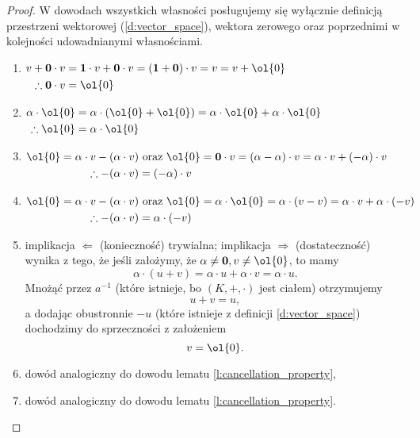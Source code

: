\begin{proof}
    W dowodach wszystkich własności posługujemy się wyłącznie definicją przestrzeni wektorowej (\ref{d:vector_space}), wektora zerowego oraz poprzednimi w kolejności udowadnianymi własnościami.
    \begin{enumerate}
        \item $\begin{aligned}[t]
            v + \mathbf{0} \cdot v &= \mathbf{1} \cdot v + \mathbf{0} \cdot v = (\mathbf{1} + \mathbf{0}) \cdot v = v = v + \ol{0} \\
            \therefore \mathbf{0} \cdot v &= \ol{0}
            \end{aligned}$
        \item $\begin{aligned}[t]
            \alpha \cdot \ol{0} &= \alpha \cdot (\ol{0} + \ol{0}) = \alpha \cdot \ol{0} + \alpha \cdot \ol{0} \\
            \therefore \ol{0} &= \alpha \cdot \ol{0}
            \end{aligned}$
        \item $\begin{aligned}[t]
            \ol{0} = \alpha \cdot v - (\alpha \cdot v) &\text{ oraz } \ol{0} = \mathbf{0} \cdot v = (\alpha - \alpha) \cdot v = \alpha \cdot v + (-\alpha) \cdot v \\
            \therefore -(\alpha \cdot v) &= (-\alpha) \cdot v
            \end{aligned}$
        \item $\begin{aligned}[t]
            \ol{0} = \alpha \cdot v - (\alpha \cdot v) &\text{ oraz } \ol{0} = \alpha \cdot \ol{0} = \alpha \cdot (v - v) = \alpha \cdot v + \alpha \cdot (-v) \\
            \therefore -(\alpha \cdot v) &= \alpha \cdot (-v)
            \end{aligned}$
        \item implikacja $\Leftarrow$ (konieczność) trywialna; implikacja $\Rightarrow$ (dostateczność) wynika z tego, że jeśli założymy, że $\alpha \neq \mathbf{0}, v \neq \ol{0}$, to mamy
            $$ \alpha \cdot (u + v) = \alpha \cdot u + \alpha \cdot v = \alpha \cdot u. $$
            Mnożąć przez $a^{-1}$ (które istnieje, bo $(K, +, \cdot)$ jest ciałem) otrzymujemy
            $$ u + v = u, $$
            a dodając obustronnie $-u$ (które istnieje z definicji \ref{d:vector_space}) dochodzimy do sprzeczności z założeniem
            $$ v = \ol{0}. $$
        \item dowód analogiczny do dowodu lematu \ref{l:cancellation_property},
        \item dowód analogiczny do dowodu lematu \ref{l:cancellation_property}.
    \end{enumerate}
\end{proof}


